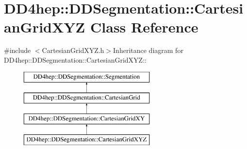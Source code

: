 \hypertarget{class_d_d4hep_1_1_d_d_segmentation_1_1_cartesian_grid_x_y_z}{
\section{DD4hep::DDSegmentation::CartesianGridXYZ Class Reference}
\label{class_d_d4hep_1_1_d_d_segmentation_1_1_cartesian_grid_x_y_z}
}


{\ttfamily \#include $<$CartesianGridXYZ.h$>$}Inheritance diagram for DD4hep::DDSegmentation::CartesianGridXYZ::\begin{figure}[H]
\begin{center}
\leavevmode
\includegraphics[height=4cm]{class_d_d4hep_1_1_d_d_segmentation_1_1_cartesian_grid_x_y_z}
\end{center}
\end{figure}
